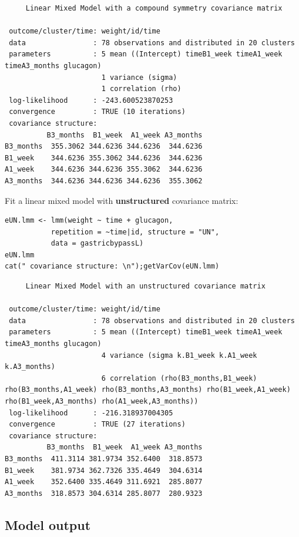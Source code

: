 \documentclass[12pt]{article}
\begin{document}
\begin{verbatim}
     Linear Mixed Model with a compound symmetry covariance matrix 

 outcome/cluster/time: weight/id/time 
 data                : 78 observations and distributed in 20 clusters 
 parameters          : 5 mean ((Intercept) timeB1_week timeA1_week timeA3_months glucagon) 
                       1 variance (sigma) 
                       1 correlation (rho) 
 log-likelihood      : -243.600523870253 
 convergence         : TRUE (10 iterations)
 covariance structure: 
          B3_months  B1_week  A1_week A3_months
B3_months  355.3062 344.6236 344.6236  344.6236
B1_week    344.6236 355.3062 344.6236  344.6236
A1_week    344.6236 344.6236 355.3062  344.6236
A3_months  344.6236 344.6236 344.6236  355.3062
\end{verbatim}


\noindent Fit a linear mixed model with \textbf{unstructured} covariance matrix:

\lstset{language=r,label= ,caption= ,captionpos=b,numbers=none}
\begin{lstlisting}
eUN.lmm <- lmm(weight ~ time + glucagon,
	       repetition = ~time|id, structure = "UN",
	       data = gastricbypassL)
eUN.lmm
cat(" covariance structure: \n");getVarCov(eUN.lmm)
\end{lstlisting}

\begin{verbatim}
     Linear Mixed Model with an unstructured covariance matrix 

 outcome/cluster/time: weight/id/time 
 data                : 78 observations and distributed in 20 clusters 
 parameters          : 5 mean ((Intercept) timeB1_week timeA1_week timeA3_months glucagon) 
                       4 variance (sigma k.B1_week k.A1_week k.A3_months) 
                       6 correlation (rho(B3_months,B1_week) rho(B3_months,A1_week) rho(B3_months,A3_months) rho(B1_week,A1_week) rho(B1_week,A3_months) rho(A1_week,A3_months)) 
 log-likelihood      : -216.318937004305 
 convergence         : TRUE (27 iterations)
 covariance structure: 
          B3_months  B1_week  A1_week A3_months
B3_months  411.3114 381.9734 352.6400  318.8573
B1_week    381.9734 362.7326 335.4649  304.6314
A1_week    352.6400 335.4649 311.6921  285.8077
A3_months  318.8573 304.6314 285.8077  280.9323
\end{verbatim}

\clearpage

\subsection{Model output}
\label{sec:orgc2d4466}
\end{document}
